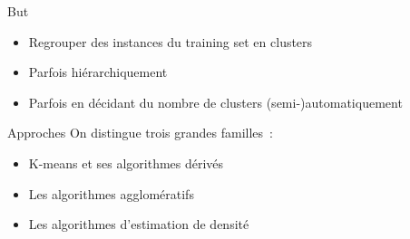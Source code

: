 \begin{frame}{But}
  \begin{itemize}[<+->]
    \item Regrouper des instances du training set en \og{}clusters\fg{}
    \item Parfois hiérarchiquement
    \item Parfois en décidant du nombre de clusters (semi-)automatiquement
  \end{itemize}
\end{frame}

\begin{frame}{Approches}
  On distingue trois grandes familles~:

  \begin{itemize}[<+->]
    \item K-means et ses algorithmes dérivés
    \item Les algorithmes agglomératifs
    \item Les algorithmes d'estimation de densité
  \end{itemize}
\end{frame}
